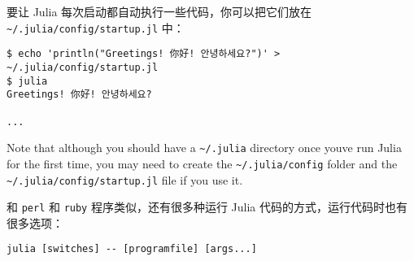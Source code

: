 要让 Julia 每次启动都自动执行一些代码，你可以把它们放在 \texttt{{\textasciitilde}/.julia/config/startup.jl} 中：




\begin{lstlisting}
$ echo 'println("Greetings! 你好! 안녕하세요?")' > ~/.julia/config/startup.jl
$ julia
Greetings! 你好! 안녕하세요?

...
\end{lstlisting}



Note that although you should have a \texttt{{\textasciitilde}/.julia} directory once you{\textquotesingle}ve run Julia for the first time, you may need to create the \texttt{{\textasciitilde}/.julia/config} folder and the \texttt{{\textasciitilde}/.julia/config/startup.jl} file if you use it.



和 \texttt{perl} 和 \texttt{ruby} 程序类似，还有很多种运行 Julia 代码的方式，运行代码时也有很多选项：




\begin{lstlisting}
julia [switches] -- [programfile] [args...]
\end{lstlisting}





